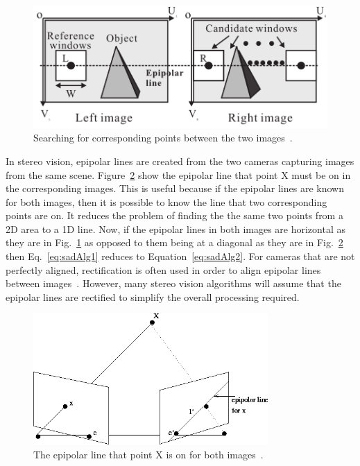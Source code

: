 \begin{figure}
\begin{center}
	\includegraphics{figures/sadCorrespondingWindows.png}
	\captionfonts
	\caption{Searching for corresponding points between the two images~\cite{sadParallel}.}
	\label{fig:sad_corr}
\end{center}
\end{figure}

In stereo vision, epipolar lines are created from the two cameras capturing images from the same scene. Figure~\ref{fig:epipolar} show the epipolar line that point X must be on in the corresponding images. This is useful because if the epipolar lines are known for both images, then it is possible to know the line that two corresponding points are on. It reduces the problem of finding the the same two points from a 2D area to a 1D line. Now, if the epipolar lines in both images are horizontal as they are in Fig.~\ref{fig:sad_corr} as opposed to them being at a diagonal as they are in Fig.~\ref{fig:epipolar} then Eq.~\ref{eq:sadAlg1} reduces to Equation~\ref{eq:sadAlg2}. For cameras that are not perfectly aligned, rectification is often used in order to align epipolar lines between images~\cite{rectification}. However, many stereo vision algorithms will assume that the epipolar lines are rectified to simplify the overall processing required.

\begin{figure}
\begin{center}
	\includegraphics[height=50mm]{figures/epipolar.png}
	\captionfonts
	\caption{The epipolar line that point X is on for both images~\cite{epipolar}.}
	\label{fig:epipolar}
\end{center}
\end{figure}

